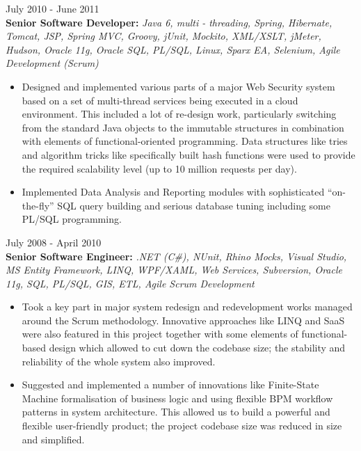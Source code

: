 \documentclass{res}
\begin{document}
\begin{resume}
 \hfill        July 2010 - June 2011\\
{\bf Senior Software Developer:} {\em Java 6, multi - threading, Spring, Hibernate, Tomcat, JSP, Spring MVC, Groovy, jUnit, Mockito, XML/XSLT, jMeter, Hudson, Oracle 11g, Oracle SQL, PL/SQL, Linux, Sparx EA, Selenium, Agile Development (Scrum)}
\begin{itemize} \itemsep -2pt %
 \item Designed and implemented various parts of a major Web Security system based on a set of multi-thread services being executed in a cloud environment. This included a lot of re-design work, particularly switching from the standard Java objects to the immutable structures in combination with elements of functional-oriented programming. Data structures like tries and algorithm tricks like specifically built hash functions were used to provide the required scalability level (up to 10 million requests per day).
 \item Implemented Data Analysis and Reporting modules with sophisticated “on-the-fly” SQL query building and serious database tuning including some PL/SQL programming.
\end{itemize}

 \hfill      July 2008 - April 2010\\
{\bf Senior Software Engineer:} {\em .NET (C\#), NUnit, Rhino Mocks, Visual Studio, MS Entity Framework, LINQ, WPF/XAML, Web Services, Subversion, Oracle 11g, SQL, PL/SQL, GIS, ETL, Agile Scrum Development}
\begin{itemize} \itemsep -2pt %
 \item Took a key part in major system redesign and redevelopment works managed around the Scrum methodology. Innovative approaches like LINQ and SaaS were also featured in this project together with some elements of functional-based design which allowed to cut down the codebase size; the stability and reliability of the whole system also improved.
 \item Suggested and implemented a number of innovations like Finite-State Machine formalisation of business logic and using flexible BPM workflow patterns in system architecture. This allowed us to build a powerful and flexible user-friendly product; the project codebase size was reduced in size and simplified.
\end{itemize}


\end{resume}
\end{document}
